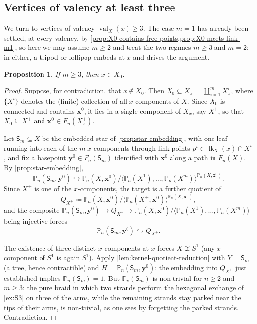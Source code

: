 \documentclass[reqno]{amsart}
\newtheorem{proposition}[theorem]{Proposition}
\theoremstyle{definition}
\newcommand\bfx{\mathbf{x}}
\newcommand\bfy{\mathbf{y}}
\newcommand\sfS{\mathsf{S}}
\newcommand{\PB}{\mathbb{P}}
\newcommand{\co}[1]{\mathopen{\langle}#1\mathclose{\rangle}} %
\newcommand{\base}{\bfx^0}
\DeclareMathOperator{\lk}{lk}
\DeclareMathOperator{\val}{val}
\numberwithin{equation}{section}
\begin{document}
\subsection{Vertices of valency at least three}

We turn to vertices of valency \(\val_X(x)\geq 3\). The case
\(m=1\) has already been settled, at every valency, by
\cref{prop:X0-contains-free-points,prop:X0-meets-link-m1}, so here
we may assume \(m\geq 2\) and treat the two regimes \(m\geq 3\) and
\(m=2\); in either, a tripod or lollipop embeds at \(x\) and drives
the argument.

\begin{proposition}\label{prop:X0-contains-valency-3}
If \(m\geq 3\), then \(x\in X_0\).
\end{proposition}

\begin{proof}
Suppose, for contradiction, that \(x\notin X_0\). Then
\(X_0\subseteq X_x=\coprod_{i=1}^m X^i_x\), where \(\{X^i\}\) denotes
the (finite) collection of all \(x\)-components of \(X\). Since
\(X_0\) is connected and contains \(\base\), it lies in a single
component of \(X_x\), say \(X^+\), so that %
\(X_0\subseteq X^+\) and \(\base\in F_n(X^+_x)\).

Let \(\sfS_m\subseteq X\) be the embedded star of
\cref{prop:star-embedding}, with one leaf running into each of the
\(m\) \(x\)-components through link points
\(p^i\in\lk_X(x)\cap X^i\), and fix a basepoint
\(\bfy^0\in F_n(\sfS_m)\) identified with \(\base\) along a path in
\(F_n(X)\). By \cref{prop:star-embedding},
\[
\PB_n(\sfS_m,\bfy^0)\hookrightarrow
\PB_n(X,\base)\big/
\co{\PB_n(X^1),\dots,\PB_n(X^m)}^{\PB_n(X,\base)}.
\]
Since \(X^+\) is one of the \(x\)-components, the target is a
further quotient of
\[Q_{X^+}\coloneqq
\PB_n(X,\base)/\co{\PB_n(X^+,\base)}^{\PB_n(X,\base)},\]
and the composite
\(\PB_n(\sfS_m,\bfy^0)\to Q_{X^+}\to
\PB_n(X,\base)/\co{\PB_n(X^1),\dots,\PB_n(X^m)}\) being injective
forces
\[
\PB_n(\sfS_m,\bfy^0)\hookrightarrow Q_{X^+}.
\]

The existence of three distinct \(x\)-components at \(x\) forces
\(X\not\cong S^1\) (any \(x\)-component of \(S^1\) is again
\(S^1\)). Apply \cref{lem:kernel-quotient-reduction} with
\(Y=\sfS_m\) (a tree, hence contractible) and
\(H=\PB_n(\sfS_m,\bfy^0)\): the embedding into \(Q_{X^+}\) just
established implies \(\PB_n(\sfS_m)=1\). But
\(\PB_n(\sfS_m)\) is non-trivial for \(n\geq2\) and \(m\geq3\): the
pure braid in which two strands perform the hexagonal exchange of
\cref{ex:S3} on three of the arms, while the remaining strands
stay parked near the tips of their arms, is non-trivial, as one
sees by forgetting the parked strands. Contradiction.
\end{proof}
\end{document}
